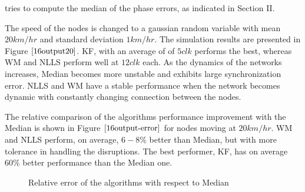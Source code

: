 \documentclass[journal]{IEEEtran}
\begin{document}
tries to compute the median of the phase errors, as indicated in
Section II.
\par
The speed of the nodes is changed to a gaussian random variable with mean $20km/hr$ and standard deviation $1km/hr$. The simulation results are presented in Figure $\ref{16output20}$. KF, with an average of of $5 clk$ performs the best, whereas WM and NLLS perform well at $12 clk$ each. As the dynamics of the networks increases, Median becomes more unstable and exhibits large synchronization error. NLLS and WM have a stable performance when the network becomes dynamic with constantly changing connection between the nodes.
\par
The relative comparison of the algorithms performance improvement with the Median is shown in Figure $\ref{16output-error}$ for nodes moving at $20km/hr$. WM and NLLS perform, on average, $6-8\%$ better than Median, but with more tolerance in handling the disruptions. The best performer, KF, has on average $60\%$ better performance than the Median one.
\begin{figure}
\centerline{  \hfil {}} \caption{Relative error of the algorithms with respect to Median}
\label{error}
\end{figure}
\end{document}
